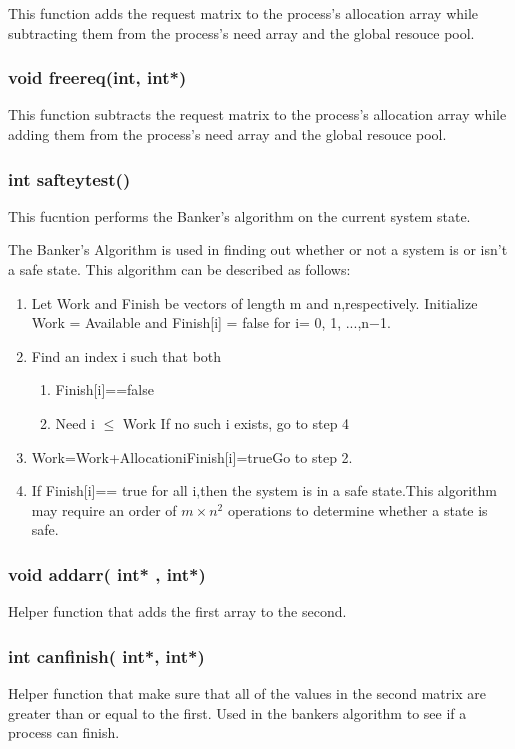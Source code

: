 \documentclass[11pt]{article}
\begin{document}
This function adds the request matrix to the process's allocation array while subtracting them from the process's need array and the global resouce pool.

\subsubsection{ void free\textunderscore req(int, int*)}

This function subtracts the request matrix to the process's allocation array while adding them from the process's need array and the global resouce pool.

\subsubsection{ int saftey\textunderscore test()}

This fucntion performs the Banker's algorithm on the current system state.

The Banker's Algorithm is used in finding out whether or not a system is or isn't a safe state. This algorithm can be described as follows:
\begin{enumerate}
\item Let Work and Finish be vectors of length m and n,respectively. Initialize Work = Available and Finish[i] = false for i= 0, 1, ...,n−1.
\item Find an index i such that both
	
	\begin{enumerate}
	\item Finish[i]==false
	\item Need i $ \leq$ Work If no such i exists, go to step 4
	\end{enumerate}
\item Work=Work+AllocationiFinish[i]=trueGo to step 2.
\item If Finish[i]== true for all i,then the system is in a safe state.This algorithm may require an order of $m\times n^2$ operations to determine whether a state is safe.
\end{enumerate}

\subsubsection{ void add\textunderscore arr( int* , int*)}

Helper function that adds the first array to the second.

\subsubsection{ int can\textunderscore finish( int*, int*)}

Helper function that make sure that all of the values in the second matrix are greater than or equal to the first. Used in the bankers algorithm to see if a process can finish.
\end{document}
